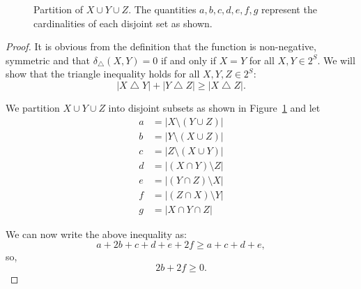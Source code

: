\documentclass[a4paper]{report}
\DeclareMathOperator{\symdif}{\bigtriangleup}
\begin{document}
\begin{figure}
  \centering
  \caption{Partition of $X \cup Y \cup Z$.  The quantities $a,b,c,d,e,f,g$
    represent the cardinalities of each disjoint set as shown.}
  \label{fig:partition}
\end{figure}

\begin{proof}
  It is obvious from the definition that the function is non-negative,
  symmetric and that $\delta_{\symdif}(X,Y)=0$ if and only if $X=Y$ for all
  $X,Y \in 2^{S}$.  We will show that the triangle inequality holds for all
  $X,Y,Z \in 2^{S}$:
  \begin{equation*}
    |X \symdif Y| + |Y \symdif Z| \geq |X \symdif Z|.
  \end{equation*}

  We partition $X \cup Y \cup Z$ into disjoint subsets as shown in
  Figure~\ref{fig:partition} and let
  \begin{align*}
    a &= |X \setminus (Y \cup Z)|\\
    b &= |Y \setminus (X \cup Z)|\\
    c &= |Z \setminus (X \cup Y)|\\
    d &= |(X \cap Y) \setminus Z|\\
    e &= |(Y \cap Z) \setminus X|\\
    f &= |(Z \cap X) \setminus Y|\\
    g &= |X \cap Y \cap Z|
  \end{align*}

  We can now write the above inequality as:
  \begin{equation*}
    a+2b+c+d+e+2f \geq a+c+d+e,
  \end{equation*}
  so,
  \begin{equation*}
    2b+2f \geq 0.
  \end{equation*}
\end{proof}
\end{document}
